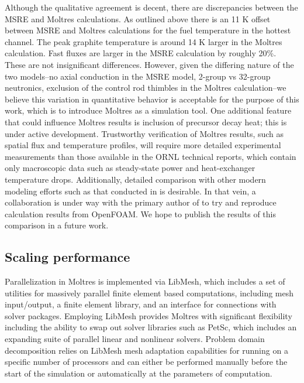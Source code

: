 \documentclass{article}
\let\Oldsubsection\subsection
\renewcommand{\subsection}{\FloatBarrier\Oldsubsection}
\begin{document}
Although the qualitative agreement is decent, there are discrepancies between
the \gls{MSRE} and Moltres calculations. As outlined above there is an 11 K
offset between \gls{MSRE} and Moltres calculations for the fuel temperature in
the hottest channel. The peak graphite temperature is around 14 K larger in the
Moltres calculation. Fast fluxes are larger in the \gls{MSRE} calculation by
roughly 20\%. These are not insignificant differences. However, given the
differing nature of the two models--no axial conduction in the \gls{MSRE} model,
2-group vs 32-group neutronics, exclusion of the control rod thimbles in the
Moltres calculation--we believe this variation in quantitative behavior is
acceptable for the purpose of this work, which is to introduce Moltres as a
simulation tool. One additional feature that could influence Moltres results is
inclusion of precursor decay heat; this is under active development. Trustworthy
verification of Moltres results, such as spatial flux and temperature profiles,
will require more detailed experimental measurements than those available in the
\gls{ORNL} technical reports, which contain only macroscopic data such as
steady-state power and heat-exchanger temperature drops. Additionally, detailed
comparison with other modern modeling efforts such as that conducted in
\cite{aufiero_development_2014,laureau_transient_2017} is desirable. In that
vein, a collaboration is under way with the primary author of
\cite{aufiero_develoment_2014} to try and reproduce calculation results from
OpenFOAM. We hope to publish the results of this comparison in a future work.

\subsection{Scaling performance}

Parallelization in Moltres is implemented via LibMesh, which includes a set of
utilities for massively parallel finite element based computations, including
mesh input/output, a finite element library, and an interface for connections with
solver packages. Employing LibMesh provides Moltres with
significant flexibility including the ability to swap out solver libraries
such as PetSc, which includes an expanding suite of parallel linear and
nonlinear solvers. Problem domain decomposition relies on LibMesh mesh
adaptation capabilities for running on a specific number of processors and
can either be performed manually before the start of the simulation or
automatically at the parameters of computation.
\end{document}
